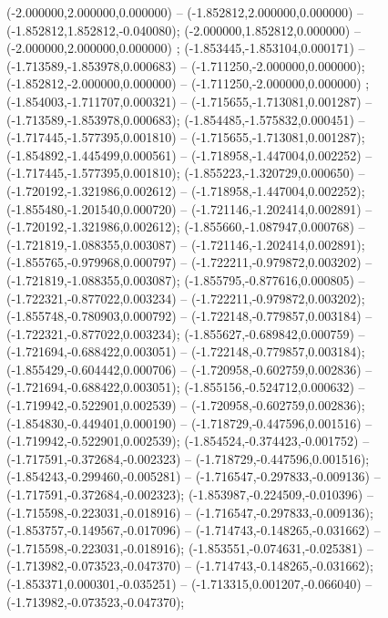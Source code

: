  (-2.000000,2.000000,0.000000) -- (-1.852812,2.000000,0.000000) -- (-1.852812,1.852812,-0.040080);
 (-2.000000,1.852812,0.000000) -- (-2.000000,2.000000,0.000000) ;
 (-1.853445,-1.853104,0.000171) -- (-1.713589,-1.853978,0.000683) -- (-1.711250,-2.000000,0.000000);
 (-1.852812,-2.000000,0.000000) -- (-1.711250,-2.000000,0.000000) ;
 (-1.854003,-1.711707,0.000321) -- (-1.715655,-1.713081,0.001287) -- (-1.713589,-1.853978,0.000683);
 (-1.854485,-1.575832,0.000451) -- (-1.717445,-1.577395,0.001810) -- (-1.715655,-1.713081,0.001287);
 (-1.854892,-1.445499,0.000561) -- (-1.718958,-1.447004,0.002252) -- (-1.717445,-1.577395,0.001810);
 (-1.855223,-1.320729,0.000650) -- (-1.720192,-1.321986,0.002612) -- (-1.718958,-1.447004,0.002252);
 (-1.855480,-1.201540,0.000720) -- (-1.721146,-1.202414,0.002891) -- (-1.720192,-1.321986,0.002612);
 (-1.855660,-1.087947,0.000768) -- (-1.721819,-1.088355,0.003087) -- (-1.721146,-1.202414,0.002891);
 (-1.855765,-0.979968,0.000797) -- (-1.722211,-0.979872,0.003202) -- (-1.721819,-1.088355,0.003087);
 (-1.855795,-0.877616,0.000805) -- (-1.722321,-0.877022,0.003234) -- (-1.722211,-0.979872,0.003202);
 (-1.855748,-0.780903,0.000792) -- (-1.722148,-0.779857,0.003184) -- (-1.722321,-0.877022,0.003234);
 (-1.855627,-0.689842,0.000759) -- (-1.721694,-0.688422,0.003051) -- (-1.722148,-0.779857,0.003184);
 (-1.855429,-0.604442,0.000706) -- (-1.720958,-0.602759,0.002836) -- (-1.721694,-0.688422,0.003051);
 (-1.855156,-0.524712,0.000632) -- (-1.719942,-0.522901,0.002539) -- (-1.720958,-0.602759,0.002836);
 (-1.854830,-0.449401,0.000190) -- (-1.718729,-0.447596,0.001516) -- (-1.719942,-0.522901,0.002539);
 (-1.854524,-0.374423,-0.001752) -- (-1.717591,-0.372684,-0.002323) -- (-1.718729,-0.447596,0.001516);
 (-1.854243,-0.299460,-0.005281) -- (-1.716547,-0.297833,-0.009136) -- (-1.717591,-0.372684,-0.002323);
 (-1.853987,-0.224509,-0.010396) -- (-1.715598,-0.223031,-0.018916) -- (-1.716547,-0.297833,-0.009136);
 (-1.853757,-0.149567,-0.017096) -- (-1.714743,-0.148265,-0.031662) -- (-1.715598,-0.223031,-0.018916);
 (-1.853551,-0.074631,-0.025381) -- (-1.713982,-0.073523,-0.047370) -- (-1.714743,-0.148265,-0.031662);
 (-1.853371,0.000301,-0.035251) -- (-1.713315,0.001207,-0.066040) -- (-1.713982,-0.073523,-0.047370);
